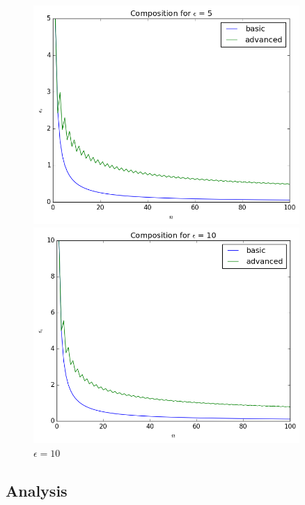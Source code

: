 \documentclass[12pt]{article}
\theoremstyle{definition}
\begin{document}
\begin{figure}[H]
    \centering
    \begin{minipage}{0.5\textwidth}
        \centering
        \includegraphics[width=0.9\textwidth]{advanced_composition_5.png}
        \caption{$\epsilon = 5$}
        \label{fig:advanced_5}
    \end{minipage}\hfill
    \begin{minipage}{0.5\textwidth}
        \centering
        \includegraphics[width=0.9\textwidth]{advanced_composition_10.png}
        \caption{$\epsilon = 10$}
        \label{fig:advanced_10}
    \end{minipage} \hfill
\end{figure}

\subsection{Analysis}
\end{document}
